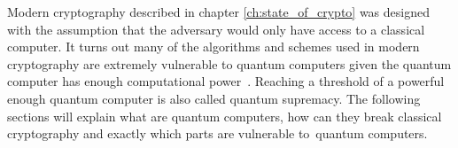 Modern cryptography described in chapter \ref{ch:state_of_crypto} was designed with the assumption that the adversary would only have access to a classical computer. It turns out many of the algorithms and schemes used in modern cryptography are extremely vulnerable to quantum computers given the quantum computer has enough computational power~\cite{Bernstein2009}. Reaching a threshold of a powerful enough quantum computer is also called quantum supremacy. The following sections will explain what are quantum computers, how can they break classical cryptography and exactly which parts are vulnerable to~quantum computers.
